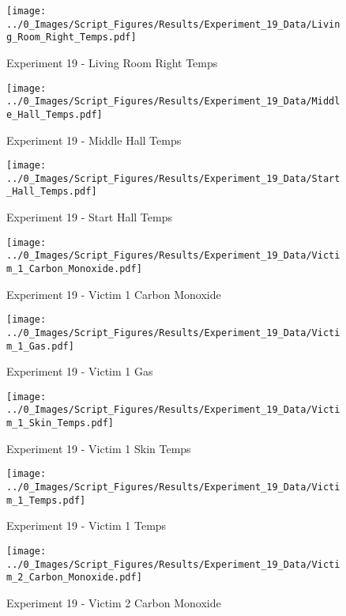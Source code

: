 	\begin{figure}[H]
		\centering
		\texttt{[image: ../0\_Images/Script\_Figures/Results/Experiment\_19\_Data/Living\_Room\_Right\_Temps.pdf]}
		\caption[]{Experiment 19 - Living Room Right Temps}
	\end{figure}
 
	\clearpage

	\begin{figure}[H]
		\centering
		\texttt{[image: ../0\_Images/Script\_Figures/Results/Experiment\_19\_Data/Middle\_Hall\_Temps.pdf]}
		\caption[]{Experiment 19 - Middle Hall Temps}
	\end{figure}
 

	\begin{figure}[H]
		\centering
		\texttt{[image: ../0\_Images/Script\_Figures/Results/Experiment\_19\_Data/Start\_Hall\_Temps.pdf]}
		\caption[]{Experiment 19 - Start Hall Temps}
	\end{figure}
 
	\clearpage

	\begin{figure}[H]
		\centering
		\texttt{[image: ../0\_Images/Script\_Figures/Results/Experiment\_19\_Data/Victim\_1\_Carbon\_Monoxide.pdf]}
		\caption[]{Experiment 19 - Victim 1 Carbon Monoxide}
	\end{figure}
 

	\begin{figure}[H]
		\centering
		\texttt{[image: ../0\_Images/Script\_Figures/Results/Experiment\_19\_Data/Victim\_1\_Gas.pdf]}
		\caption[]{Experiment 19 - Victim 1 Gas}
	\end{figure}
 
	\clearpage

	\begin{figure}[H]
		\centering
		\texttt{[image: ../0\_Images/Script\_Figures/Results/Experiment\_19\_Data/Victim\_1\_Skin\_Temps.pdf]}
		\caption[]{Experiment 19 - Victim 1 Skin Temps}
	\end{figure}
 

	\begin{figure}[H]
		\centering
		\texttt{[image: ../0\_Images/Script\_Figures/Results/Experiment\_19\_Data/Victim\_1\_Temps.pdf]}
		\caption[]{Experiment 19 - Victim 1 Temps}
	\end{figure}
 
	\clearpage

	\begin{figure}[H]
		\centering
		\texttt{[image: ../0\_Images/Script\_Figures/Results/Experiment\_19\_Data/Victim\_2\_Carbon\_Monoxide.pdf]}
		\caption[]{Experiment 19 - Victim 2 Carbon Monoxide}
	\end{figure}
 

